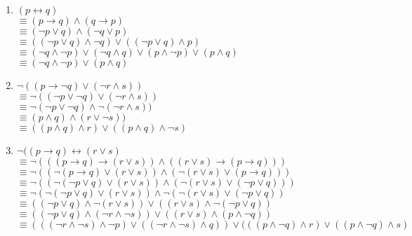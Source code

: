 \documentclass{article}
\begin{document}
\begin{enumerate}[label=(\alph*)]
\begin{enumerate}[label=\roman*.]
        \item 
        \quad $(p\leftrightarrow{}q)$ \\
        \quad $\equiv{}(p\rightarrow{}q)\land{}(q\rightarrow{}p)$  \\
        \quad $\equiv{}(\neg{}p\lor{}q)\land{}(\neg{}q\lor{}p)$  \\
        \quad $\equiv{}((\neg{}p\lor{}q)\land{}\neg{}q)\lor((\neg{}p\lor{}q)\land{}p)$ \\
        \quad $\equiv{}(\neg{}q\land{}\neg{}p)\lor{}(\neg{}q\land{}q)\lor{}(p\land{}\neg{}p)\lor{}(p\land{}q)$ \\
        \quad $\equiv{}(\neg{}q\land{}\neg{}p)\lor{}(p\land{}q)$ \\
        
        \item 
        \quad $\neg{}((p\rightarrow{}\neg{}q)\lor(\neg{}r\land{}s))$ \\
        \quad $\equiv{} \neg{}((\neg{}p\lor{}\neg{}q)\lor(\neg{}r\land{}s))$ \\
        \quad $\equiv{} \neg{}(\neg{}p\lor{}\neg{}q)\land{}\neg{}(\neg{}r\land{}s))$ \\
        \quad $\equiv{} (p\land{}q)\land{}(r\lor{}\neg{}s))$ \\
        \quad $\equiv{} ((p\land{}q)\land{}r)\lor{}((p\land{}q)\land{}\neg{}s)$ \\
        
        \item 
        \quad $\neg{}((p\rightarrow{}q)\leftrightarrow{}(r\lor{}s)$ \\
        \quad $\equiv{} \neg{}(((p\rightarrow{}q)\rightarrow{}(r\lor{}s))\land{}((r\lor{}s)\rightarrow{}(p\rightarrow{}q)))$ \\
        \quad $\equiv{} \neg{}((\neg{}(p\rightarrow{}q)\lor{}(r\lor{}s))\land{}(\neg{}(r\lor{}s)\lor{}(p\rightarrow{}q)))$ \\
        \quad $\equiv{} \neg{}((\neg{}(\neg{}p\lor{}q)\lor{}(r\lor{}s))\land{}(\neg{}(r\lor{}s)\lor{}(\neg{}p\lor{}q)))$ \\
        \quad $\equiv{} \neg{}(\neg{}(\neg{}p\lor{}q)\lor{}(r\lor{}s))\land{}\neg{}(\neg{}(r\lor{}s)\lor{}(\neg{}p\lor{}q))$ \\
        \quad $\equiv{} ((\neg{}p\lor{}q)\land{}\neg{}(r\lor{}s))\lor{}((r\lor{}s)\land{}\neg{}(\neg{}p\lor{}q))$ \\
        \quad $\equiv{} ((\neg{}p\lor{}q)\land{}(\neg{}r\land{}\neg{}s))\lor{}((r\lor{}s)\land{}(p\land{}\neg{}q))$ \\
        \quad $\equiv{} (((\neg{}r\land{}\neg{}s)\land{}\neg{}p)\lor{}((\neg{}r\land{}\neg{}s)\land{}q))\lor{}(((p\land{}\neg{}q)\land{}r)\lor{}((p\land{}\neg{}q)\land{}s)$ \\ 
    \end{enumerate}
    

\end{enumerate}
\end{document}
